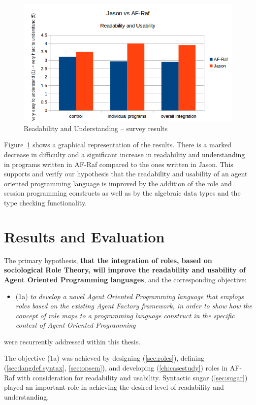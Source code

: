 \documentclass[a4paper,12pt,oneside,fleqn]{book} %
\begin{document}
\begin{figure}\footnotesize %
\includegraphics{jasonvsafraf.png}
\caption{Readability and Understanding -- survey results}
\label{fig:Survey}
\end{figure} %

Figure~\ref{fig:Survey} shows a graphical representation of the results.
There is a marked decrease in difficulty and a significant increase in
readability and understanding in programs written in AF-Raf compared to the
ones written in Jason. This supports and verify our hypothesis that the
readability and usability of an agent oriented programming language is
improved by the addition of the role and session programming constructs as
well as by the algebraic data types and the type checking functionality.

\chapter{Results and Evaluation}\label{ch:results} %

The primary hypothesis, \textbf{that the integration of roles, based on
sociological Role Theory, will improve the readability and usability of
Agent Oriented Programming languages}, and the corresponding objective:

\begin{itemize}
  \item (1a) \textit{to develop a novel Agent Oriented Programming language that employs roles based on the existing Agent Factory framework, in order to show how the concept of role maps to a programming language construct in the specific context of Agent Oriented Programming} 
\end{itemize}
were recurrently addressed within this thesis. 

The objective (1a) was achieved by designing (\autoref{sec:roles}),
defining (\autoref{sec:langdef.syntax}, \autoref{sec:opsem}), and
developing (\autoref{ch:casestudy}) roles in AF-Raf with consideration for
readability and usability. Syntactic sugar (\autoref{sec:sugar}) played an
important role in achieving the desired level of readability and
understanding.
\end{document}

